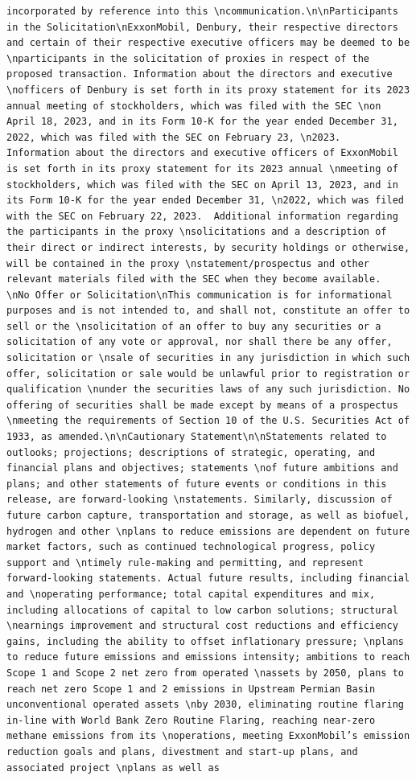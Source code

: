 \documentclass[
  letterpaper,
  DIV=11,
  numbers=noendperiod]{scrreprt}
\begin{document}
\begin{verbatim}
incorporated by reference into this \ncommunication.\n\nParticipants in the Solicitation\nExxonMobil, Denbury, their respective directors and certain of their respective executive officers may be deemed to be \nparticipants in the solicitation of proxies in respect of the proposed transaction. Information about the directors and executive \nofficers of Denbury is set forth in its proxy statement for its 2023 annual meeting of stockholders, which was filed with the SEC \non April 18, 2023, and in its Form 10-K for the year ended December 31, 2022, which was filed with the SEC on February 23, \n2023.  Information about the directors and executive officers of ExxonMobil is set forth in its proxy statement for its 2023 annual \nmeeting of stockholders, which was filed with the SEC on April 13, 2023, and in its Form 10-K for the year ended December 31, \n2022, which was filed with the SEC on February 22, 2023.  Additional information regarding the participants in the proxy \nsolicitations and a description of their direct or indirect interests, by security holdings or otherwise, will be contained in the proxy \nstatement/prospectus and other relevant materials filed with the SEC when they become available.  \nNo Offer or Solicitation\nThis communication is for informational purposes and is not intended to, and shall not, constitute an offer to sell or the \nsolicitation of an offer to buy any securities or a solicitation of any vote or approval, nor shall there be any offer, solicitation or \nsale of securities in any jurisdiction in which such offer, solicitation or sale would be unlawful prior to registration or qualification \nunder the securities laws of any such jurisdiction. No offering of securities shall be made except by means of a prospectus \nmeeting the requirements of Section 10 of the U.S. Securities Act of 1933, as amended.\n\nCautionary Statement\n\nStatements related to outlooks; projections; descriptions of strategic, operating, and financial plans and objectives; statements \nof future ambitions and plans; and other statements of future events or conditions in this release, are forward-looking \nstatements. Similarly, discussion of future carbon capture, transportation and storage, as well as biofuel, hydrogen and other \nplans to reduce emissions are dependent on future market factors, such as continued technological progress, policy support and \ntimely rule-making and permitting, and represent forward-looking statements. Actual future results, including financial and \noperating performance; total capital expenditures and mix, including allocations of capital to low carbon solutions; structural \nearnings improvement and structural cost reductions and efficiency gains, including the ability to offset inflationary pressure; \nplans to reduce future emissions and emissions intensity; ambitions to reach Scope 1 and Scope 2 net zero from operated \nassets by 2050, plans to reach net zero Scope 1 and 2 emissions in Upstream Permian Basin unconventional operated assets \nby 2030, eliminating routine flaring in-line with World Bank Zero Routine Flaring, reaching near-zero methane emissions from its \noperations, meeting ExxonMobil’s emission reduction goals and plans, divestment and start-up plans, and associated project \nplans as well as 
\end{verbatim}
\end{document}
